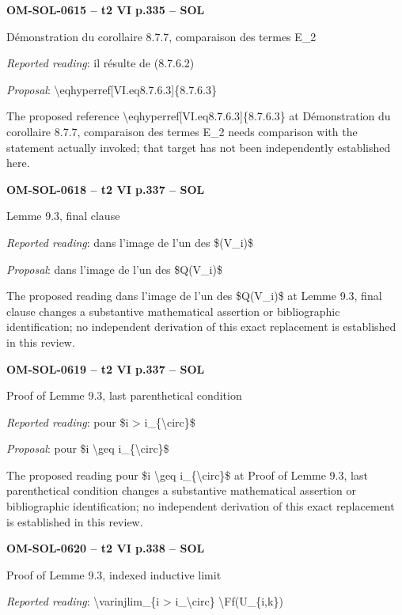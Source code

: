 \par\noindent\textbf{OM-SOL-0615 -- t2 VI p.335 -- SOL}\par
Démonstration du corollaire 8.7.7, comparaison des termes E\_2\par
\emph{Reported reading}: il résulte de (8.7.6.2)\par
\emph{Proposal}: \textbackslash{}eqhyperref[VI.eq8.7.6.3]\{8.7.6.3\}\par
The proposed reference \textbackslash{}eqhyperref[VI.eq8.7.6.3]\{8.7.6.3\} at Démonstration du corollaire 8.7.7, comparaison des termes E\_2 needs comparison with the statement actually invoked; that target has not been independently established here.\par
\par\noindent\textbf{OM-SOL-0618 -- t2 VI p.337 -- SOL}\par
Lemme 9.3, final clause\par
\emph{Reported reading}: dans l'image de l'un des \$(V\_i)\$\par
\emph{Proposal}: dans l'image de l'un des \$Q(V\_i)\$\par
The proposed reading dans l'image de l'un des \$Q(V\_i)\$ at Lemme 9.3, final clause changes a substantive mathematical assertion or bibliographic identification; no independent derivation of this exact replacement is established in this review.\par
\par\noindent\textbf{OM-SOL-0619 -- t2 VI p.337 -- SOL}\par
Proof of Lemme 9.3, last parenthetical condition\par
\emph{Reported reading}: pour \$i > i\_\{\textbackslash{}circ\}\$\par
\emph{Proposal}: pour \$i \textbackslash{}geq i\_\{\textbackslash{}circ\}\$\par
The proposed reading pour \$i \textbackslash{}geq i\_\{\textbackslash{}circ\}\$ at Proof of Lemme 9.3, last parenthetical condition changes a substantive mathematical assertion or bibliographic identification; no independent derivation of this exact replacement is established in this review.\par
\par\noindent\textbf{OM-SOL-0620 -- t2 VI p.338 -- SOL}\par
Proof of Lemme 9.3, indexed inductive limit\par
\emph{Reported reading}: \textbackslash{}varinjlim\_\{i > i\_\textbackslash{}circ\} \textbackslash{}Ff(U\_\{i,k\})\par
